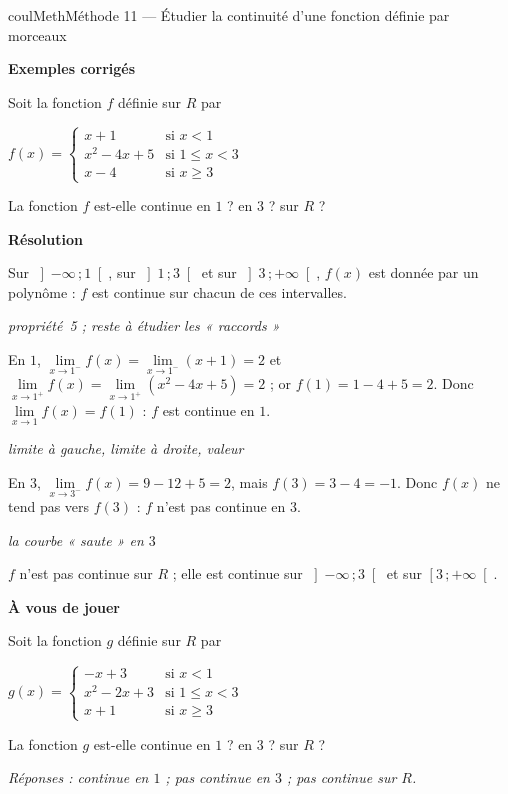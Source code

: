 \documentclass[11pt,a4paper]{article}
\makeatletter
\newcommand{\R}{\mathbb{R}}
\newcommand{\N}{\mathbb{N}}
\newcommand{\Z}{\mathbb{Z}}
\newcommand{\Q}{\mathbb{Q}}
\newcommand{\vect}[1]{\overrightarrow{#1}}
\newcommand{\fois}[1]{\times{\color{coulExo}#1}}
\newcommand{\lycee@repere}[4]{%
  \draw[grille,step=1] (#1,#2) grid (#3,#4);
  \draw[-{Stealth[length=2mm]},thick] (#1,0)--({#3+0.4},0) node[below left=-1pt]{$x$};
  \draw[-{Stealth[length=2mm]},thick] (0,#2)--(0,{#4+0.4}) node[below left=-1pt]{$y$};
  \node[below left,font=\scriptsize,inner sep=1.5pt] at (0,0) {$0$};}
\newcommand{\lycee@gradx}[1]{\foreach \k/\l in {#1}{%
  \draw (\k,0.07)--(\k,-0.07) node[below,font=\scriptsize,inner sep=1.5pt]{$\l$};}}
\newcommand{\lycee@grady}[1]{\foreach \k/\l in {#1}{%
  \draw (0.07,\k)--(-0.07,\k) node[left,font=\scriptsize,inner sep=1.5pt]{$\l$};}}
\newcommand{\lycee@intfo}[2]{\left[#1\,;#2\right[}
\newcommand{\lycee@intoo}[2]{\left]#1\,;#2\right[}
\providecommand{\repere}{\lycee@repere}%
\providecommand{\gradx}{\lycee@gradx}%
\providecommand{\grady}{\lycee@grady}%
\providecommand{\Cf}{\mathcal{C}\sb{f}}%
\providecommand{\Cg}{\mathcal{C}\sb{g}}%
\providecommand{\intfo}{\lycee@intfo}%
\providecommand{\intoo}{\lycee@intoo}%
\newcounter{lycee@signet}
\newcommand{\signet}[3][]{\stepcounter{lycee@signet}%
  \edef\lycee@dest{\if\relax\detokenize{#1}\relax
    signet.\arabic{lycee@signet}\else#1\fi}%
  \hypertarget{\lycee@dest}{}\bookmark[level=#2,dest=\lycee@dest]{#3}}
\def\R{R}\def\N{N}\def\Z{Z}\def\Q{Q}\def\vect#1{#1}\def\Cf{Cf}\def\Cg{Cg}\def\fois#1{×#1}%
\newcommand{\res}[1]{#1}
\newcounter{methode}
\newenvironment{methodebox}[1][Méthode]{\stepcounter{methode}%
  \begin{boitecours}[phantom={\signet[methode-\arabic{methode}]{2}{#1}}]{coulMeth}{#1}}%
  {\end{boitecours}}
\newcommand{\etape}[1]{\par\smallskip\textbf{\color{coulMeth}#1}\par\nobreak\smallskip}
\newcommand{\reponse}[1]{\par\smallskip
  {\footnotesize\itshape\color{black!55}Réponses : #1}}
\newcommand{\explique}[2]{\par\smallskip\noindent
  \begin{minipage}[t]{0.57\linewidth}\raggedright #1\end{minipage}\hfill
  \begin{minipage}[t]{0.40\linewidth}\raggedright\leavevmode
    {\small\itshape\color{black!60}#2}\end{minipage}\par}
\newcommand{\cas}[1]{\par\smallskip\noindent\textbf{\color{coulExo}#1}\vadjust{\nobreak}}
\newenvironment{correction}{\par}{\par}
\newcommand{\etapeexemples}{\etape{Exemples corrigés}}
\makeatother
\begin{document}
\begin{methodebox}[Méthode 11 --- Étudier la continuité d'une fonction définie par morceaux]
\etapeexemples
\begin{minipage}[c]{0.58\linewidth}\raggedright
Soit la fonction $f$ définie sur $\R$ par
\begin{center}
$f(x)=\begin{cases}x+1 & \text{si } x<1\\ x^{2}-4x+5 & \text{si } 1\leq x<3\\
x-4 & \text{si } x\geq 3\end{cases}$
\end{center}
La fonction $f$ est-elle continue en $1$ ? en $3$ ? sur $\R$ ?
\end{minipage}\hfill
\begin{minipage}[c]{0.38\linewidth}\centering
{}
\end{minipage}
\begin{correction}
\cas{Résolution}\par\nopagebreak
\explique{Sur $\intoo{-\infty}{1}$, sur $\intoo{1}{3}$ et sur $\intoo{3}{+\infty}$,
$f(x)$ est donnée par un polynôme : $f$ est continue sur chacun de ces
intervalles.}{propriété~5 ; reste à étudier les « raccords »}
\explique{En $1$, $\lim\limits_{x\to 1^{-}}f(x)=\lim\limits_{x\to 1^{-}}(x+1)=2$ et
$\lim\limits_{x\to 1^{+}}f(x)=\lim\limits_{x\to 1^{+}}\left(x^{2}-4x+5\right)=2$ ; or
$f(1)=1-4+5=2$. Donc $\lim\limits_{x\to 1}f(x)=f(1)$ : \res{$f$ est continue en
$1$}.}{limite à gauche, limite à droite, valeur}
\explique{En $3$, $\lim\limits_{x\to 3^{-}}f(x)=9-12+5=2$, mais $f(3)=3-4=-1$. Donc
$f(x)$ ne tend pas vers $f(3)$ : \res{$f$ n'est pas continue en $3$}.}{la courbe
« saute » en $3$}
\explique{\res{$f$ n'est pas continue sur $\R$} ; elle est continue sur
$\intoo{-\infty}{3}$ et sur $\intfo{3}{+\infty}$.}{}
\end{correction}

\etape{À vous de jouer}
Soit la fonction $g$ définie sur $\R$ par
\begin{center}
$g(x)=\begin{cases}-x+3 & \text{si } x<1\\ x^{2}-2x+3 & \text{si } 1\leq x<3\\
x+1 & \text{si } x\geq 3\end{cases}$
\end{center}
La fonction $g$ est-elle continue en $1$ ? en $3$ ? sur $\R$ ?
\reponse{continue en $1$ ; pas continue en $3$ ; pas continue sur $\R$.}
\end{methodebox}
\end{document}
